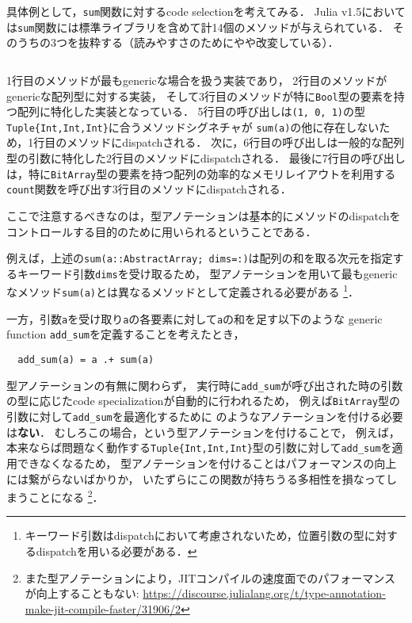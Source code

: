 
具体例として，\verb|sum|関数に対するcode selectionを考えてみる．
Julia v1.5においては\verb|sum|関数には標準ライブラリを含めて計14個のメソッドが与えられている．
そのうちの3つを抜粋する（読みやすさのためにやや改変している）．

\inputminted[frame=lines, linenos]{julia}{src/sums_method.jl}

1行目のメソッドが最もgenericな場合を扱う実装であり，
2行目のメソッドがgenericな配列型に対する実装，
そして3行目のメソッドが特に\verb|Bool|型の要素を持つ配列に特化した実装となっている．
5行目の呼び出しは\verb|(1, 0, 1)|の型\verb|Tuple{Int,Int,Int}|に合うメソッドシグネチャが
\verb|sum(a)|の他に存在しないため，1行目のメソッドにdispatchされる．
次に，6行目の呼び出しは一般的な配列型の引数に特化した2行目のメソッドにdispatchされる．
最後に7行目の呼び出しは，特に\verb|BitArray|型の要素を持つ配列の効率的なメモリレイアウトを利用する
\verb|count|関数を呼び出す3行目のメソッドにdispatchされる．

ここで注意するべきなのは，型アノテーションは基本的にメソッドのdispatchをコントロールする目的のために用いられるということである．

例えば，上述の\verb|sum(a::AbstractArray; dims=:)|は配列の和を取る次元を指定するキーワード引数\verb|dims|を受け取るため，
型アノテーションを用いて最もgenericなメソッド\verb|sum(a)|とは異なるメソッドとして定義される必要がある
\footnote{
  キーワード引数はdispatchにおいて考慮されないため，位置引数の型に対するdispatchを用いる必要がある．
}．

一方，引数\verb|a|を受け取り\verb|a|の各要素に対して\verb|a|の和を足す以下のような
generic function \verb|add_sum|を定義することを考えたとき，
\begin{verbatim}
  add_sum(a) = a .+ sum(a)
\end{verbatim}
型アノテーションの有無に関わらず，
実行時に\verb|add_sum|が呼び出された時の引数の型に応じたcode specializationが自動的に行われるため，
例えば\verb|BitArray|型の引数に対して\verb|add_sum|を最適化するために
のようなアノテーションを付ける必要は\textbf{ない}．
むしろこの場合，という型アノテーションを付けることで，
例えば，本来ならば問題なく動作する\verb|Tuple{Int,Int,Int}|型の引数に対して\verb|add_sum|を適用できなくなるため，
型アノテーションを付けることはパフォーマンスの向上には繋がらないばかりか，
いたずらにこの関数が持ちうる多相性を損なってしまうことになる
\footnote{
  また型アノテーションにより，JITコンパイルの速度面でのパフォーマンスが向上することもない:
  \url{https://discourse.julialang.org/t/type-annotation-make-jit-compile-faster/31906/2}
}．

